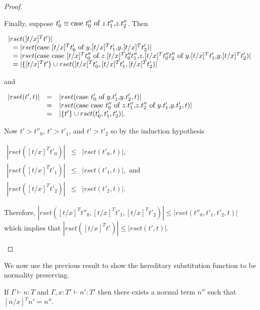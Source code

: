 \begin{proof}
\begin{itemize}
  Finally, suppose $t'_0 \equiv \mbox{case}\ t''_0\ \text{of}\ z\text{.}t''_1\text{,}z\text{.}t''_2$.  Then 
  \begin{center}
    \begin{math}
      \begin{array}{lll}
        |rset([t/x]^T t')| \\
        \,\,\,\,= |rset(\mbox{case}\ [t/x]^T t'_0\ \text{of}\ y\text{.}[t/x]^T t'_1\text{,}y\text{.}[t/x]^T t'_2)|\\
        \,\,\,\,= |rset(\mbox{case}\ \mbox{case}\ [t/x]^T t''_0\ \text{of}\ z\text{.}[t/x]^T t''_0 t''_1\text{,}z\text{.}[t/x]^T t''_0 t''_2\ \text{of}\ y\text{.}[t/x]^T t'_1\text{,}y\text{.}[t/x]^T t'_2)|\\
        \,\,\,\,= |\{[t/x]^T t'\} \cup rset([t/x]^T t'_0, [t/x]^T t'_1, [t/x]^T t'_2)|
      \end{array}
    \end{math}
  \end{center}
  and
  \begin{center}
    \begin{math}
      \begin{array}{lll}
        |rset(t',t)| & = & |rset(\mbox{case}\ t'_0\ \text{of}\ y\text{.}t'_1\text{,}y\text{.}t'_2,t)|\\
        & = & |rset(\mbox{case}\ \mbox{case}\ t''_0\ \text{of}\ z\text{.}t''_1\text{,}z\text{.}t''_2\ \text{of}\ y\text{.}t'_1\text{,}y\text{.}t'_2,t)|\\
        & = & |\{t'\} \cup rset(t'_0, t'_1,t'_2)|.
      \end{array}
    \end{math}
  \end{center}
  Now $t' > t''_0$, $t' > t'_1$, and $t' > t'_2$ so by the induction hypothesis
  \begin{center}
    \begin{math}
      \begin{array}{lll}
        |rset([t/x]^T t'_0)| & \leq & |rset(t'_0,t)|,\\
        |rset([t/x]^T t'_1)|  & \leq & |rset(t'_1,t)|, \text{ and }\\
        |rset([t/x]^T t'_2)|  & \leq & |rset(t'_2,t)|.
      \end{array}
    \end{math}
  \end{center}
  Therefore, $|rset([t/x]^T t''_0, [t/x]^T t'_1, [t/x]^T t'_2)| \leq |rset(t''_0, t'_1, t'_2, t)|$
  which implies that $|rset([t/x]^T t')| \leq |rset(t',t)|$.  
\end{itemize}
\end{proof}
\noindent
We now use the previous result to show the hereditary substitution
function to be normality preserving.
\begin{lemma}
  \label{corollary:normalization_preserving_ssfp}
  If $\Gamma \vdash n:T$ and $\Gamma, x:T' \vdash n':T'$ then there exists 
  a normal term $n''$ such that $[n/x]^T n' = n''$.
\end{lemma}
